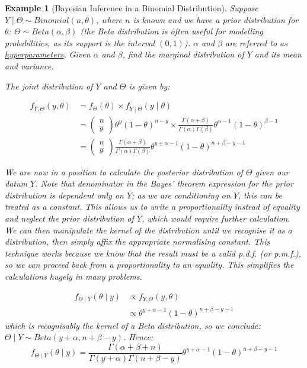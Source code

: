 \documentclass[12pt,a4paper]{article}
\newtheorem{ex}[thm]{Example}
\begin{document}
\begin{ex}[Bayesian Inference in a Binomial Distribution]\vspace{1cm}

Suppose $Y\mid\Theta \sim Binomial(n,\theta)$, where $n$ is known and we have a prior distribution for $\theta$: $\Theta \sim Beta(\alpha,\beta)$ (the Beta distribution is often useful for modelling probabilities, as its support is the interval $(0,1)$). $\alpha$ and $\beta$ are referred to as \underline{hyperparameters}. Given $\alpha$ and $\beta$, find the marginal distribution of $Y$ and its mean and variance.

The joint distribution of $Y$ and $\Theta$ is given by:

\begin{align*}
f_{Y,\Theta}(y,\theta) &= f_\Theta(\theta) \times f_{Y\mid\Theta}(y\mid\theta)\\
&= \left(\begin{array}{c} \!\!n\!\! \\ \!\!y\!\!\end{array}\right)\theta^y (1-\theta)^{n-y} \times \frac{\Gamma(\alpha + \beta)}{\Gamma(\alpha)\Gamma(\beta)}\theta^{\alpha-1} (1-\theta)^{\beta -1}\\
&= \left(\begin{array}{c}\!\!n\!\! \\ \!\!y\!\!\end{array}\right) \frac{\Gamma(\alpha + \beta)}{\Gamma(\alpha)\Gamma(\beta)} \theta^{y+\alpha-1} (1-\theta)^{n+\beta - y -1}
\end{align*}

We are now in a position to calculate the posterior distribution of $\Theta$ given our datum $Y$. Note that denominator in the Bayes' theorem expression for the prior distribution is dependent only on $Y$; as we are conditioning on $Y$, this can be treated as a constant. This allows us to write a proportionality instead of equality and neglect the prior distribution of $Y$, which would require further calculation. We can then manipulate the kernel of the distribution until we recognise it as a distribution, then simply affix the appropriate normalising constant. This technique works because we know that the result must be a valid p.d.f. (or p.m.f.), so we can proceed back from a proportionality to an equality. This simplifies the calculations hugely in many problems.

\begin{align*}
f_{\Theta\mid Y}(\theta\mid y) &\propto f_{Y,\Theta}(y,\theta)\\
&\propto \theta^{y+\alpha-1} (1-\theta)^{n+\beta-y-1}
\end{align*}
which is recognisably the kernel of a Beta distribution, so we conclude: $\Theta\mid Y \sim Beta(y+\alpha,n+\beta-y)$. Hence:
$$f_{\Theta\mid Y}(\theta\mid y) = \frac{\Gamma(\alpha+\beta+n)}{\Gamma(y+\alpha)\Gamma(n+\beta -y)} \theta^{y+\alpha-1} (1-\theta)^{n+\beta-y-1}$$


\end{ex}
\end{document}
